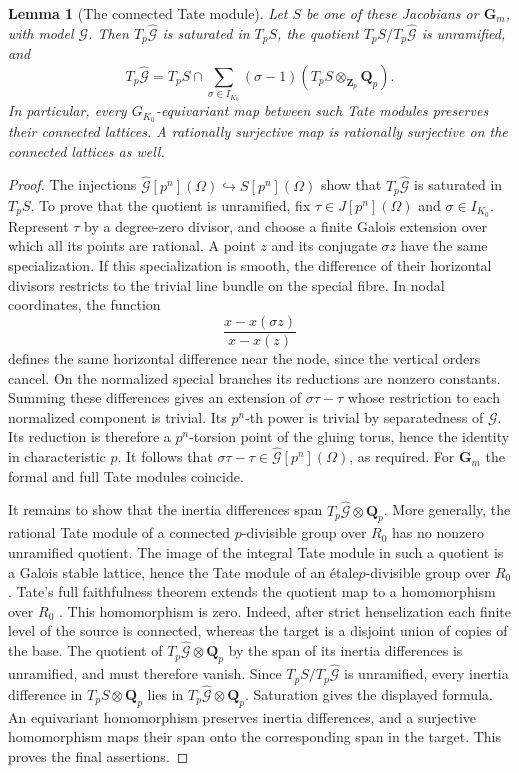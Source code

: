 \documentclass[11pt,a4paper]{article}
\numberwithin{equation}{section}
\theoremstyle{plain}
\newtheorem{lemma}[theorem]{Lemma}
\theoremstyle{definition}
\theoremstyle{remark}
\newcommand{\etale}{\'etale}
\renewcommand{\S}{\ensuremath{\mathsection}}
\begin{document}
\begin{lemma}[The connected Tate module]
\label{loc:inertia-lattice}
Let $S$ be one of these Jacobians or $\mathbf G_m$, with model
$\mathcal G$.  Then $T_p\widehat{\mathcal G}$ is saturated in $T_pS$,
the quotient $T_pS/T_p\widehat{\mathcal G}$ is unramified, and
\[
 T_p\widehat{\mathcal G}
 =T_pS\cap\sum_{\sigma\in I_{K_0}}
       (\sigma-1)(T_pS\otimes_{\mathbf Z_p}\mathbf Q_p).
\]
In particular, every $G_{K_0}$-equivariant map between such Tate modules
preserves their connected lattices.  A rationally surjective map is
rationally surjective on the connected lattices as well.
\end{lemma}
\begin{proof}
The injections
$\widehat{\mathcal G}[p^n](\Omega)\hookrightarrow S[p^n](\Omega)$
show that $T_p\widehat{\mathcal G}$ is saturated in $T_pS$.  To prove
that the quotient is unramified, fix $\tau\in J[p^n](\Omega)$ and
$\sigma\in I_{K_0}$.  Represent $\tau$ by a degree-zero divisor, and
choose a finite Galois extension over which all its points are rational.
A point $z$ and its conjugate $\sigma z$ have the same specialization.
If this specialization is smooth, the difference of their horizontal
divisors restricts to the trivial line bundle on the special fibre.
In nodal coordinates, the function
\[
                       \frac{x-x(\sigma z)}{x-x(z)}
\]
defines the same horizontal difference near the node, since the
vertical orders cancel.  On the normalized special branches its
reductions are nonzero constants.  Summing these differences gives an
extension of $\sigma\tau-\tau$ whose restriction to each normalized
component is trivial.  Its $p^n$-th power is trivial by separatedness of
$\mathcal G$.  Its reduction is therefore a $p^n$-torsion point of the
gluing torus, hence the identity in characteristic $p$.  It follows that
$\sigma\tau-\tau\in\widehat{\mathcal G}[p^n](\Omega)$, as required.
For $\mathbf G_m$ the formal and full Tate modules coincide.

It remains to show that the inertia differences span
$T_p\widehat{\mathcal G}\otimes\mathbf Q_p$.
More generally, the rational Tate module of a connected $p$-divisible
group over $R_0$ has no nonzero unramified quotient.  The image of the
integral Tate module in such a quotient is a Galois stable lattice,
hence the Tate module of an \etale $p$-divisible group over $R_0$
\cite[\S1.4]{Tate1967}.  Tate's full faithfulness theorem extends the
quotient map to a homomorphism over $R_0$
\cite[\S4.2, Theorem~4]{Tate1967}.  This homomorphism is zero.  Indeed,
after strict henselization each finite level of the source is connected,
whereas the target is a disjoint union of copies of the base.  The
quotient of $T_p\widehat{\mathcal G}\otimes\mathbf Q_p$ by the span of
its inertia differences is unramified, and must therefore vanish.
Since $T_pS/T_p\widehat{\mathcal G}$ is
unramified, every inertia difference in $T_pS\otimes\mathbf Q_p$ lies
in $T_p\widehat{\mathcal G}\otimes\mathbf Q_p$.  Saturation gives the
displayed formula.  An equivariant homomorphism
preserves inertia differences, and a surjective homomorphism maps their
span onto the corresponding span in the target.  This proves the final
assertions.
\end{proof}
\end{document}
